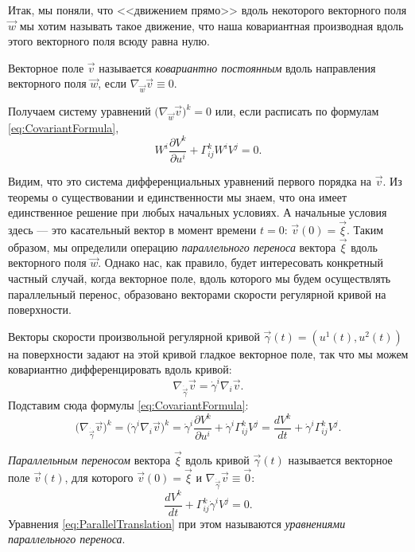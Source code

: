 Итак, мы поняли, что <<движением прямо>> вдоль некоторого векторного поля $\vec{w}$ мы хотим называть такое движение, что наша ковариантная производная вдоль этого векторного поля всюду равна нулю.

\begin{definition}
	Векторное поле $\vec{v}$ называется \textit{ковариантно постоянным} вдоль направления векторного поля $\vec{w}$, если $\nabla_{\vec{w}}\vec{v} \equiv 0$.
\end{definition}

Получаем систему уравнений $\big(\nabla_{\vec{w}}\vec{v}\big)^k = 0$ или, если расписать по формулам \eqref{eq:CovariantFormula},
\[
	W^i\frac{\partial V^k}{\partial u^i} + \Gamma_{ij}^kW^iV^j = 0.
\]

Видим, что это система дифференциальных уравнений первого порядка на $\vec{v}$. Из теоремы о существовании и единственности мы знаем, что она имеет единственное решение при любых начальных условиях. А начальные условия здесь --- это касательный вектор в момент времени $t = 0$: $\vec{v}(0) = \vec{\xi}$. Таким образом, мы определили операцию \textit{параллельного переноса} вектора $\vec{\xi}$ вдоль векторного поля $\vec{w}$. Однако нас, как правило, будет интересовать конкретный частный случай, когда векторное поле, вдоль которого мы будем осуществлять параллельный перенос, образовано векторами скорости регулярной кривой на поверхности.

Векторы скорости произвольной регулярной кривой $\vec{\gamma}(t) = (u^1(t), u^2(t))$ на поверхности задают на этой кривой гладкое векторное поле, так что мы можем ковариантно дифференцировать вдоль кривой:
\[
	\nabla_{\dot{\vec{\gamma}}}\vec{v} = \dot{\gamma}^i\nabla_i\vec{v}.
\]
Подставим сюда формулы \eqref{eq:CovariantFormula}:
\[
	\big(\nabla_{\dot{\vec{\gamma}}}\vec{v}\big)^k = \big(\dot{\gamma}^i\nabla_i\vec{v}\big)^k = \dot{\gamma}^i\frac{\partial V^k}{\partial u^i} + \dot{\gamma}^i\Gamma_{ij}^kV^j = \frac{dV^k}{dt} + \dot{\gamma}^i\Gamma_{ij}^kV^j.
\]

\begin{definition}
	\textit{Параллельным переносом} вектора $\vec{\xi}$ вдоль кривой $\vec{\gamma}(t)$ называется векторное поле $\vec{v}(t)$, для которого $\vec{v}(0) = \vec{\xi}$ и $\nabla_{\dot{\vec{\gamma}}}\vec{v} \equiv \vec{0}$:
	\begin{equation} \label{eq:ParallelTranslation}
		\frac{dV^k}{dt} + \Gamma_{ij}^k\dot{\gamma}^iV^j = 0.
	\end{equation}
	Уравнения \eqref{eq:ParallelTranslation} при этом называются \textit{уравнениями параллельного переноса}.
\end{definition}


